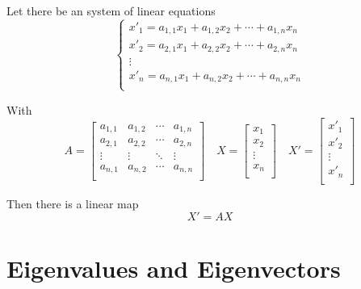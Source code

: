 \begin{remark}
    Let there be an system of linear equations
    \begin{equation}
        \left\{
        \begin{array}{c}
            x\prime_1 = a_{1, 1} x_1 + a_{1, 2} x_2 + \cdots + a_{1, n} x_n \\
            x\prime_2 = a_{2, 1} x_1 + a_{2, 2} x_2 + \cdots + a_{2, n} x_n \\
            \vdots \\
            x\prime_n = a_{n, 1} x_1 + a_{n, 2} x_2 + \cdots + a_{n, n} x_n \\
        \end{array}
        \right.
    \end{equation}
    
    With
    \begin{equation}
        A = \begin{bmatrix}
            a_{1, 1} & a_{1, 2} & \cdots & a_{1, n} \\
            a_{2, 1} & a_{2, 2} & \cdots & a_{2, n} \\
            \vdots   & \vdots   & \ddots & \vdots   \\
            a_{n, 1} & a_{n, 2} & \cdots & a_{n, n} \\
        \end{bmatrix}
        \quad
        X = \begin{bmatrix}
            x_1    \\
            x_2    \\
            \vdots \\
            x_n    \\
        \end{bmatrix}
        \quad
        X\prime = \begin{bmatrix}
            x\prime_1 \\
            x\prime_2 \\
            \vdots    \\
            x\prime_n \\
        \end{bmatrix}
    \end{equation}
    
    Then there is a linear map
    \begin{equation}
        X\prime = A X
    \end{equation}
\end{remark}

\section{Eigenvalues and Eigenvectors}

